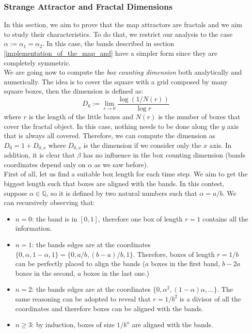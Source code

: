 \documentclass[11pt,titlepage]{article}
\begin{document}
\subsubsection{Strange Attractor and Fractal Dimensions}
In this section, we aim to prove that the map attractors are fractals and we aim to study their characteristics. To do that, we restrict our analysis to the case $\alpha:=\alpha_1=\alpha_2$.  In this case, the bands described in section \ref{implementation_of_the_map_and} have a simpler form since they are completely symmetric. \\
We are going now to compute the \emph{box counting dimension} both analytically and numerically. The idea is to cover the square with a grid composed by many square boxes, then the dimension is defined as:
\begin{equation*}
	D_0 := \lim_{r\rightarrow 0}\frac{\log(1/N(r))}{\log{r}}
\end{equation*}
where $r$ is the length of the little boxes and $N(r)$ is the number of boxes that cover the fractal object. In this case, nothing needs to be done along the $y$ axis that is always all covered. Therefore, we can compute the dimension as $D_0 = 1+D_{0,x}$ where $D_{0,x}$ is the dimension if we consider only the $x$ axis. In addition, it is clear that $\beta$ has no influence in the box counting dimension (bands coordinates depend only on $\alpha$ as we saw before). \\
First of all, let us find a suitable box length for each time step. We aim to get the biggest length such that boxes are aligned with the bands. In this contest, suppose $\alpha \in \mathbb{Q}$, so it is defined by two natural numbers such that $\alpha = a/b$. We can recursively observing that:
\begin{itemize}
	\item $n=0$: the band is in $[0,1]$, therefore one box of length $r=1$ contains all the information.
	\item $n=1$: the bands edges are at the coordinates $\{0, \alpha, 1-\alpha, 1\}=\{0, a/b, (b-a)/b, 1\}$. Therefore, boxes of length $r=1/b$ can be perfectly placed to align the bands ($a$ boxes in the first band, $b-2a$ boxes in the second, $a$ boxes in the last one.)
	\item $n=2$:  the bands edges are at the coordinates $\{0, \alpha^2, (1-\alpha)\alpha, \dots\}$. The same reasoning can be adopted to reveal that $r=1/b^2$ is a divisor of all the coordinates and therefore boxes can be aligned with the bands.
	\item $n\ge 3$: by induction, boxes of size $1/b^n$ are aligned with the bands.
\end{itemize}
\end{document}
